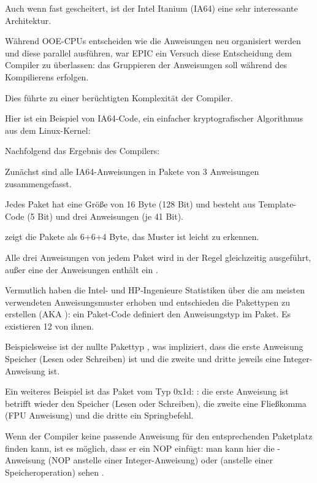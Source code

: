 \label{itanium}

Auch wenn fast gescheitert, ist der Intel Itanium (\ac{IA64}) eine sehr interessante
Architektur.

Während \ac{OOE}-CPUs entscheiden wie die Anweisungen neu organisiert werden und
diese parallel ausführen, war \ac{EPIC} ein Versuch diese Entscheidung dem Compiler
zu überlassen: das Gruppieren der Anweisungen soll während des Kompilierens erfolgen.

Dies führte zu einer berüchtigten Komplexität der Compiler.

Hier ist ein Beispiel von \ac{IA64}-Code, ein einfacher kryptografischer Algorithmus
aus dem Linux-Kernel:



Nachfolgend das Ergebnis des Compilers:



Zunächst sind alle \ac{IA64}-Anweisungen in Pakete von 3 Anweisungen zusammengefasst.

Jedes Paket hat eine Größe von 16 Byte (128 Bit) und besteht aus Template-Code
(5 Bit) und drei Anweisungen (je 41 Bit).

\IDA zeigt die Pakete als 6+6+4 Byte, das Muster ist leicht zu erkennen.

Alle drei Anweisungen von jedem Paket wird in der Regel gleichzeitig ausgeführt,
außer eine der Anweisungen enthält ein .

Vermutlich haben die Intel- und HP-Ingenieure Statistiken über die am meisten verwendeten
Anweisungsmuster erhoben und entschieden die Pakettypen zu erstellen (\ac{AKA} ): 
ein Paket-Code definiert den Anweisungstyp im Paket.
Es existieren 12 von ihnen.

Beispielsweise ist der nullte Pakettyp , was impliziert, dass die erste
Anweisung Speicher (Lesen oder Schreiben) ist und die zweite und dritte jeweils
eine Integer-Anweisung ist.

Ein weiteres Beispiel ist das Paket vom Typ 0x1d: :
die erste Anweisung ist betrifft wieder den Speicher (Lesen oder Schreiben), die
zweite eine Fließkomma (\ac{FPU} Anweisung) und die dritte ein Springbefehl.

Wenn der Compiler keine passende Anweisung für den entsprechenden Paketplatz finden
kann, ist es möglich, dass er ein \ac{NOP} einfügt: man kann hier die -Anweisung
(\ac{NOP} anstelle einer Integer-Anweisung) oder  (anstelle einer Speicheroperation)
sehen .

